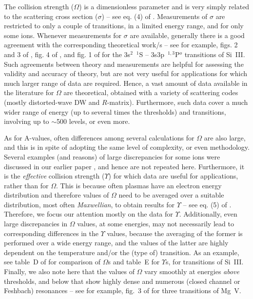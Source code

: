 \documentclass[fleqn]{article}
\begin{document}
The collision strength ($\Omega$) is a dimensionless parameter and is very simply related to the scattering cross section ($\sigma$) -- see eq. (4) of \cite{fst}. Measurements of $\sigma$ are restricted to only a couple of transitions, in a limited energy range, and for only some ions. Whenever measurements for $\sigma$ are available, generally there is a good agreement with the corresponding theoretical work/s -- see for example,  figs. 2 and 3 of \cite{wall},  fig. 4 of \cite{rise}, and  fig. 1 of \cite{kai} for the 3s$^2$~$^1$S -- 3s3p~$^{1,3}$P$^o$ transitions of Si~III. Such agreements between theory and measurements are helpful for assessing the validity and accuracy of theory, but are not very useful for applications for which much larger range of data are required. Hence, a vast amount of data available in the literature for $\Omega$ are theoretical, obtained with a variety of scattering codes (mostly distorted-wave DW and $R$-matrix). Furthermore, such data cover a much wider range of energy (up to several times the thresholds) and  transitions, involving up to $\sim$500  levels, or even more. 

As for A-values, often differences among several calculations for $\Omega$ are also large, and this is in spite of adopting the same level of complexity, or even methodology. Several examples (and reasons) of large discrepancies  for some ions were  discussed in our earlier paper \cite{fst}, and hence are not repeated here. Furthermore, it is the {\em effective} collision strength ($\Upsilon$) for which data are useful for applications, rather  than for $\Omega$. This is because often plasmas have an electron energy distribution and therefore values of $\Omega$  need to be averaged over a suitable distribution, most often {\em Maxwellian}, to obtain results for $\Upsilon$ -- see eq. (5) of \cite{fst}. Therefore, we focus our attention mostly on the data for $\Upsilon$. Additionally, even large discrepancies in $\Omega$ values, at some energies,  may not necessarily lead to corresponding differences in the $\Upsilon$ values, because the averaging of the former is performed over a wide energy range, and the values of the latter are highly dependent on the temperature and/or the (type of) transition. As an example, see table~D of \cite{si3} for comparison of $\Omega$s and table~E for $\Upsilon$s, for transitions of Si~III. Finally, we also note here that the values of $\Omega$ vary smoothly at energies {\em above} thresholds, and below that show highly dense and  numerous (closed channel or Feshbach) resonances -- see for example, fig.~3 of \cite{mgv} for three transitions of Mg~V.
\end{document}
